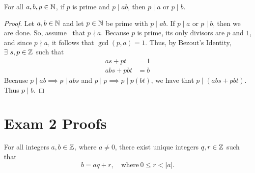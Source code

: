 \documentclass{scrartcl}
\begin{document}
\begin{lemma}
  For all $a, b, p \in \mathbb{N}$, if $p$ is prime and $p \mid ab$, then $p \mid a$ or $p \mid b$.
\end{lemma}

\begin{proof}
  Let $a,b \in \mathbb{N}$ and let $p\in\mathbb{N}$ be prime with $p \mid ab$. If $p \mid a$ or $p \mid b$, then we are done. So, assume \WLOG\ that $p \nmid a$. Because $p$ is prime, its only divisors are $p$ and $1$, and since $p \nmid a$, it follows that $\gcd{(p, a)} = 1$. Thus, by Bezout's Identity, $\exists\ s,p \in \mathbb{Z}$ such that
  \begin{align*}
    as + pt &= 1 \\
    abs + pbt &= b
  \end{align*}
  Because $p \mid ab\implies p \mid abs$ and $p \mid p \implies p \mid p(bt)$, we have that $p \mid (abs + pbt)$. Thus $p \mid b$.
\end{proof}
\newpage
\section{Exam 2 Proofs}

\begin{theorem}
  For all integers $a,b \in \mathbb{Z}$, where $a \neq 0$, there exist unique integers $q,r \in \mathbb{Z}$ such that \[ b = aq+r, \quad \mathrm{where\ } 0\leq r < |a|. \]
\end{theorem}
\end{document}
